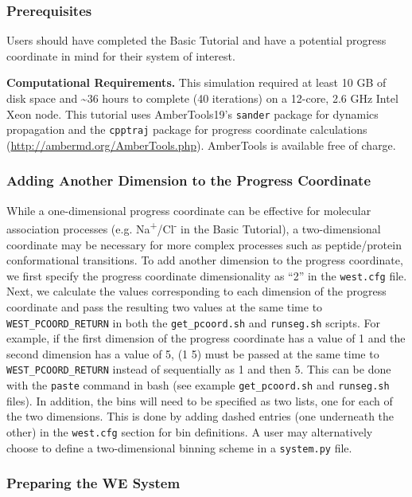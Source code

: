 \documentclass[9pt,tutorial,pubversion]{livecoms}
\begin{document}
\subsubsection{Prerequisites}

Users should have completed the Basic Tutorial and have a potential progress coordinate in mind for their system of interest. 

\textbf{Computational Requirements.} This simulation required at least 10 GB of disk space and \textasciitilde 36 hours to complete (40 iterations) on a 12-core, 2.6 GHz Intel Xeon node.
This tutorial uses AmberTools19’s \verb|sander| package for dynamics propagation and the  \verb|cpptraj| package for progress coordinate calculations (\url{http://ambermd.org/AmberTools.php}).  
AmberTools is available free of charge.

\subsubsection{Adding Another Dimension to the Progress Coordinate}

While a one-dimensional progress coordinate can be effective for molecular association processes (e.g. Na\textsuperscript{+}/Cl\textsuperscript{-} in the Basic Tutorial), a two-dimensional coordinate may be necessary for more complex processes such as peptide/protein conformational transitions. 
To add another dimension to the progress coordinate, we first specify the progress coordinate dimensionality as “2” in the \verb|west.cfg| file. 
Next, we calculate the values corresponding to each dimension of the progress coordinate and pass the resulting two values at the same time to \verb|WEST_PCOORD_RETURN| in both the \verb|get_pcoord.sh| and \verb|runseg.sh| scripts. 
For example, if the first dimension of the progress coordinate has a value of 1 and the second dimension has a value of 5, (1 5) must be passed at the same time to \verb|WEST_PCOORD_RETURN| instead of sequentially as 1 and then 5. 
This can be done with the \verb|paste| command in bash (see example \verb|get_pcoord.sh| and \verb|runseg.sh| files). 
In addition, the bins will need to be specified as two lists, one for each of the two dimensions.
This is done by adding dashed entries (one underneath the other) in the \verb|west.cfg| section for bin definitions. 
A user may alternatively choose to define a two-dimensional binning scheme in a \verb|system.py| file.

\subsubsection{Preparing the WE System}
\end{document}
